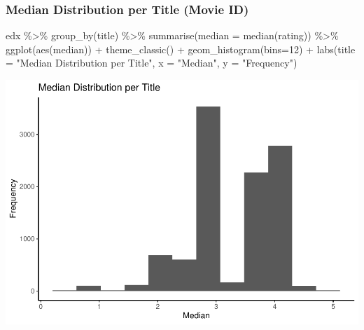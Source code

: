 \documentclass[
]{article}
\newenvironment{Shaded}{}{}
\newcommand{\AttributeTok}[1]{\textcolor[rgb]{0.49,0.56,0.16}{#1}}
\newcommand{\DecValTok}[1]{\textcolor[rgb]{0.25,0.63,0.44}{#1}}
\newcommand{\FunctionTok}[1]{\textcolor[rgb]{0.02,0.16,0.49}{#1}}
\newcommand{\NormalTok}[1]{#1}
\newcommand{\SpecialCharTok}[1]{\textcolor[rgb]{0.25,0.44,0.63}{#1}}
\newcommand{\StringTok}[1]{\textcolor[rgb]{0.25,0.44,0.63}{#1}}
\begin{document}
\hypertarget{median-distribution-per-title-movie-id}{%
\subsubsection{Median Distribution per Title (Movie
ID)}\label{median-distribution-per-title-movie-id}}

\begin{Shaded}
\begin{Highlighting}[]
\NormalTok{edx }\SpecialCharTok{\%\textgreater{}\%}
   \FunctionTok{group\_by}\NormalTok{(title) }\SpecialCharTok{\%\textgreater{}\%}
   \FunctionTok{summarise}\NormalTok{(}\AttributeTok{median =} \FunctionTok{median}\NormalTok{(rating)) }\SpecialCharTok{\%\textgreater{}\%}
   \FunctionTok{ggplot}\NormalTok{(}\FunctionTok{aes}\NormalTok{(median)) }\SpecialCharTok{+}
   \FunctionTok{theme\_classic}\NormalTok{()  }\SpecialCharTok{+}
   \FunctionTok{geom\_histogram}\NormalTok{(}\AttributeTok{bins=}\DecValTok{12}\NormalTok{) }\SpecialCharTok{+}
   \FunctionTok{labs}\NormalTok{(}\AttributeTok{title =} \StringTok{"Median Distribution per Title"}\NormalTok{,}
        \AttributeTok{x =} \StringTok{"Median"}\NormalTok{,}
        \AttributeTok{y =} \StringTok{"Frequency"}\NormalTok{)}
\end{Highlighting}
\end{Shaded}

\begin{center}\includegraphics{MovieLens-Project-Code_files/figure-latex/unnamed-chunk-27-1} \end{center}
\end{document}
